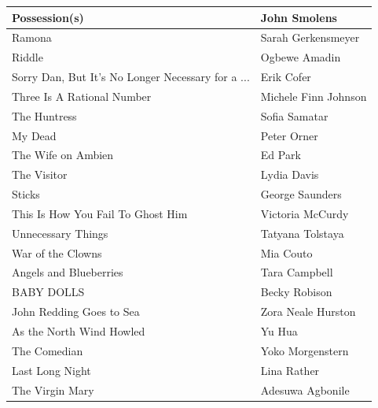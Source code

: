 \documentclass[11pt]{article}
\begin{document}
\begin{longtable}{l|l}
  Possession(s)                                     & John Smolens               \\ \hline
  Ramona                                            & Sarah Gerkensmeyer         \\ \hline
  Riddle                                            & Ogbewe Amadin              \\ \hline
  Sorry Dan, But It’s No Longer Necessary for a ... & Erik Cofer                 \\ \hline
  Three Is A Rational Number                        & Michele Finn Johnson       \\ \hline
  The Huntress                                      & Sofia Samatar              \\ \hline
  My Dead                                           & Peter Orner                \\ \hline
  The Wife on Ambien                                & Ed Park                    \\ \hline
  The Visitor                                       & Lydia Davis                \\ \hline
  Sticks                                            & George Saunders            \\ \hline
  This Is How You Fail To Ghost Him                 & Victoria McCurdy           \\ \hline
  Unnecessary Things                                & Tatyana Tolstaya           \\ \hline
  War of the Clowns                                 & Mia Couto                  \\ \hline
  Angels and Blueberries                            & Tara Campbell              \\ \hline
  BABY DOLLS                                        & Becky Robison              \\ \hline
  John Redding Goes to Sea                          & Zora Neale Hurston         \\ \hline
  As the North Wind Howled                          & Yu Hua                     \\ \hline
  The Comedian                                      & Yoko Morgenstern           \\ \hline
  Last Long Night                                   & Lina Rather                \\ \hline
  The Virgin Mary                                   & Adesuwa Agbonile           \\ \hline

\end{longtable}
\end{document}
